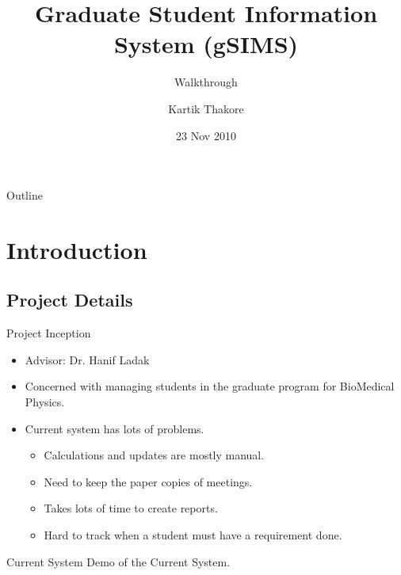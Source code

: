 \documentclass{beamer}
\title[Project Title] %
{Graduate Student Information System (gSIMS) }
\subtitle
{Walkthrough} %
\author[Author] %
{Kartik Thakore\inst{1}}
\institute[University Information] %
{
	\inst{1}%
		Department of Software Engineering\\
		University of Western Ontario
}
\date[Date] %
{23 Nov 2010}
\begin{document}
\begin{frame}
\titlepage
\end{frame}

\begin{frame}{Outline}
\tableofcontents
\end{frame}




\section{Introduction}

\subsection[Project Details]{Project Details}
\begin{frame}{Project Inception}

\begin{itemize}
\item
Advisor: Dr. Hanif Ladak
\item
Concerned with managing students in the graduate program for BioMedical Physics.
\item 
Current system has lots of problems.
\begin{itemize}
\item 
Calculations and updates are mostly manual.
\item
Need to keep the paper copies of meetings.
\item 
Takes lots of time to create reports.
\item 
Hard to track when a student must have a requirement done.
\end{itemize}
\end{itemize}
\end{frame}
\begin{frame}{Current System}
Demo of the Current System.
\end{frame}
\end{document}
